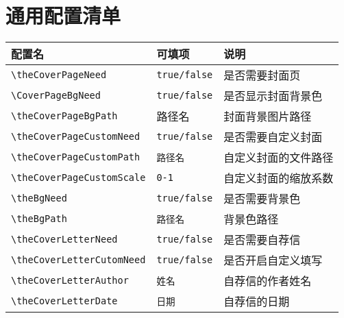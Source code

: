 \documentclass[a4paper,12pt]{ctexart}
\begin{document}
	\newpage
	\section{通用配置清单}
	\begin{table}[!h]
		\centering

		\begin{tabularx}{\textwidth}{|l|l|>{\raggedright\arraybackslash}X|}
			\hline
			\textbf{配置名}                    & \textbf{可填项}                                        & \textbf{说明}                      \\
			\hline
			\texttt{\textbackslash theCoverPageNeed}        & \texttt{true/false}                               & 是否需要封面页                   \\
			\hline
			\texttt{\textbackslash CoverPageBgNeed}        & \texttt{true/false}                               & 是否显示封面背景色               \\
			\hline
			\texttt{\textbackslash theCoverPageBgPath}     & 路径名                & 封面背景图片路径                 \\
			\hline
			\texttt{\textbackslash theCoverPageCustomNeed} & \texttt{true/false}                               & 是否需要自定义封面               \\
			\hline
			\texttt{\textbackslash theCoverPageCustomPath} & \texttt{路径名}& 自定义封面的文件路径             \\
			\hline
			\texttt{\textbackslash theCoverPageCustomScale} & \texttt{0-1}& 自定义封面的缩放系数             \\
			\hline
			\texttt{\textbackslash theBgNeed}              & \texttt{true/false}                               & 是否需要背景色                   \\
			\hline
			\texttt{\textbackslash theBgPath}              & \texttt{路径名}& 背景色路径                       \\
			\hline
			\texttt{\textbackslash theCoverLetterNeed}     & \texttt{true/false}                               & 是否需要自荐信                   \\
			\hline
			\texttt{\textbackslash theCoverLetterCutomNeed} & \texttt{true/false}                               & 是否开启自定义填写               \\
			\hline
			\texttt{\textbackslash theCoverLetterAuthor}   & \texttt{姓名}& 自荐信的作者姓名                 \\
			\hline
			\texttt{\textbackslash theCoverLetterDate}     & \texttt{日期}& 自荐信的日期                     \\

\end{tabularx}
\end{table}
\end{document}
